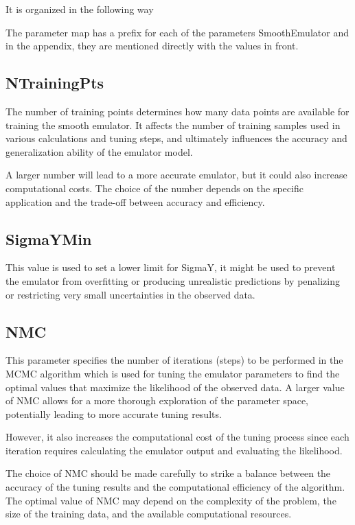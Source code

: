 \documentclass[12pt]{article}
\numberwithin{equation}{section}
\numberwithin{figure}{section}
\begin{document}
It is organized in the following way

The parameter map has a prefix for each of the parameters SmoothEmulator and in the appendix, they are mentioned directly with the values in front. 

\subsection{NTrainingPts}
The number of training points determines how many data points are available for training the smooth emulator. It affects the number of training samples used in various calculations and tuning steps, and ultimately influences the accuracy and generalization ability of the emulator model. 

A larger number will lead to a more accurate emulator, but it could also increase computational costs. The choice of the number depends on the specific application and the trade-off between accuracy and efficiency.


\subsection{SigmaYMin}
 
This value is used to set a lower limit for SigmaY, it might be used to prevent the emulator from overfitting or producing unrealistic predictions by penalizing or restricting very small uncertainties in the observed data. 



\subsection{NMC}

This parameter specifies the number of iterations (steps) to be performed in the MCMC algorithm which is used for tuning the emulator parameters to find the optimal values that maximize the likelihood of the observed data. A larger value of NMC allows for a more thorough exploration of the parameter space, potentially leading to more accurate tuning results.

However, it also increases the computational cost of the tuning process since each iteration requires calculating the emulator output and evaluating the likelihood.

The choice of NMC should be made carefully to strike a balance between the accuracy of the tuning results and the computational efficiency of the algorithm. The optimal value of NMC may depend on the complexity of the problem, the size of the training data, and the available computational resources.  
\end{document}
